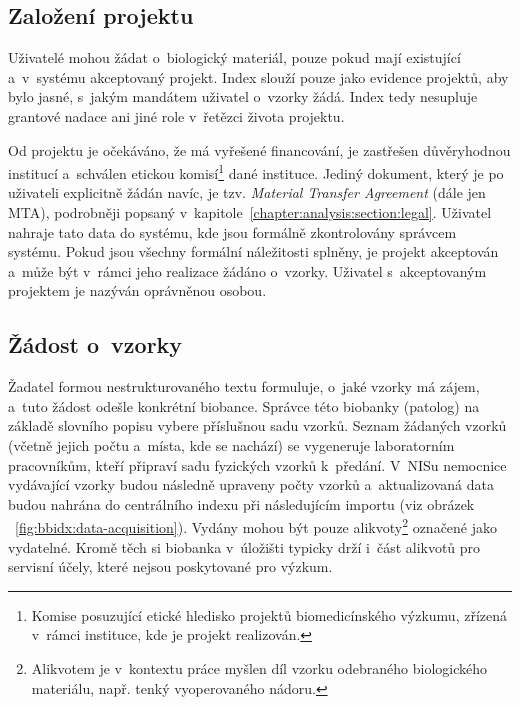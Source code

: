 \documentclass[11pt, final, oneside]{fithesis2}
\begin{document}
\subsection{Založení projektu}
Uživatelé mohou žádat o~biologický materiál, pouze pokud mají existující a~v~systému akceptovaný projekt. Index slouží pouze jako evidence projektů, aby bylo jasné, s~jakým mandátem uživatel o~vzorky žádá. Index tedy nesupluje grantové nadace ani jiné role v~řetězci života projektu. 

Od projektu je očekáváno, že má vyřešené financování, je zastřešen důvěryhodnou institucí a~schválen etickou komisí\footnote{Komise posuzující etické hledisko projektů biomedicínského výzkumu, zřízená v~rámci instituce, kde je projekt realizován.} dané instituce. Jediný dokument, který je po uživateli explicitně žádán navíc, je tzv. \textit{Material Transfer Agreement} (dále jen MTA), podrobněji popsaný v~kapitole~\ref{chapter:analysis:section:legal}. Uživatel nahraje tato data do systému, kde jsou formálně zkontrolovány správcem systému. Pokud jsou všechny formální náležitosti splněny, je projekt akceptován a~může být v~rámci jeho realizace žádáno o~vzorky.
Uživatel s~akceptovaným projektem je nazýván oprávněnou osobou. 

\subsection{Žádost o~vzorky}

Žadatel formou nestrukturovaného textu formuluje, o~jaké vzorky má zájem, a~tuto žádost odešle konkrétní biobance. Správce této biobanky (patolog) na základě slovního popisu vybere příslušnou sadu vzorků. Seznam žádaných vzorků (včetně jejich počtu a~místa, kde se nachází) se vygeneruje laboratorním pracovníkům, kteří připraví sadu fyzických vzorků k~předání. V~NISu nemocnice vydávající vzorky budou následně upraveny počty vzorků a~aktualizovaná data budou nahrána do centrálního indexu při následujícím importu (viz obrázek ~\ref{fig:bbidx:data-acquisition}). Vydány mohou být pouze alikvoty\footnote{Alikvotem je v~kontextu práce myšlen díl vzorku odebraného biologického materiálu, např. tenký  vyoperovaného nádoru.} označené jako vydatelné. Kromě těch si biobanka v~úložišti typicky drží i~část alikvotů pro servisní účely, které nejsou poskytované pro výzkum.
\end{document}
